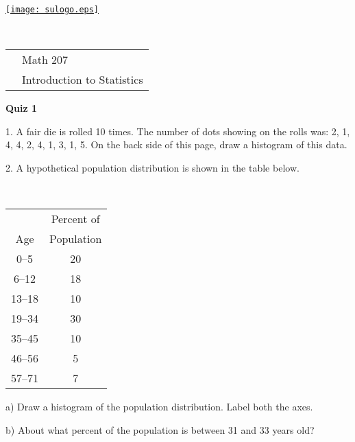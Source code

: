 \documentclass[10pt]{article}
\begin{document}
\pagestyle{empty}
\lstset{language=R, showspaces=false, showstringspaces=false}

\href{http://www.su.edu}{\texttt{[image: sulogo.eps]}}
\vspace{-1.69cm}

{{\ }\hfill\small
\begin{tabular}{cl}
& Math 207\\
& Introduction to Statistics\\
\end{tabular}
}
\setlength{\baselineskip}{1.05\baselineskip}
\bigskip

\begin{center}
\textbf{\large  Quiz 1}
\end{center}
\medskip
\newcommand{\Z}{\hphantom{0}}

1. A fair die is rolled 10 times.  The number of dots showing on the rolls
was:  2, 1, 4, 4, 2, 4, 1, 3, 1, 5. On the back side of this page, 
draw a histogram of this data.
\vspace{.5in}

2. A hypothetical population distribution is shown in the table below.

{\ }\hspace{10pt}\begin{tabular}{cc}
       & Percent of\\
Age    & Population\\\hline
0--5   & 20\vphantom{\Large Y}\\  %
\Z6--12  & 18\\  %
13--18 & 10\\  %
19--34 & 30\\  %
35--45 & 10\\  %
46--56 & \Z5\\ %
57--71 & \Z7   %
\end{tabular}
\vspace{.5in}

\hspace{5pt} a) Draw a histogram of the population distribution.  Label
both the axes.

\hspace{5pt} b) About what percent  of the population is between 31 and 33 years old?
\vspace{.5in}

\end{document}
